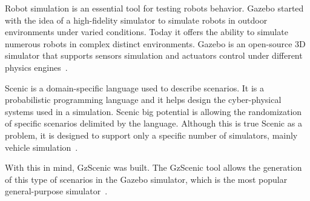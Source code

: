 \par

Robot simulation is an essential tool for testing robots behavior. 
Gazebo started with the idea of a high-fidelity simulator to simulate 
robots in outdoor environments under varied conditions.
Today it offers the ability to simulate numerous robots in complex distinct environments.
Gazebo is an open-source 3D simulator that supports sensors simulation 
and actuators control under different physics engines~\cite{Gazebo}.

\par

Scenic is a domain-specific language used to describe scenarios.
It is a probabilistic programming language and it helps design the 
cyber-physical systems used in a simulation.
Scenic big potential is allowing the randomization of specific scenarios delimited by the language.
Although this is true Scenic as a problem, it is designed to support only 
a specific number of simulators, mainly vehicle simulation~\cite{Scenic}.

\par

With this in mind, GzScenic was built. The GzScenic tool allows the generation of this type of 
scenarios in the Gazebo simulator, which is the most popular general-purpose simulator~\cite{GzScenic}.